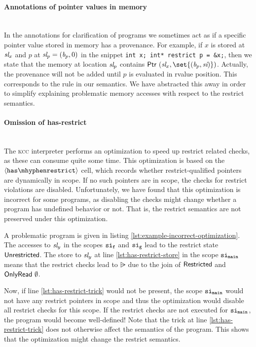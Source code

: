\paragraph{Annotations of pointer values in memory} \leavevmode \\
In the annotations for clarification of programs we sometimes act as if a specific pointer value stored in memory has a provenance.
For example, if $x$ is stored at $\textit{sl}_x$ and $p$ at $\textit{sl}_p = (\textit{b}_p, 0)$ in the snippet \texttt{int x; int* restrict p = &x;},
then we state that the memory at location $\textit{sl}_p$ contains $\ptr{(\Simplelocvar_x, \set{(\Blockvar_p, \Scopeidvar)})}$.
Actually, the provenance will not be added until $p$ is evaluated in rvalue position.
This corresponds to the rule  in our semantics.
We have abstracted this away in order to simplify explaining problematic memory accesses with respect to the restrict semantics.  


\paragraph{Omission of has-restrict} \leavevmode \\
The \textsc{kcc} interpreter performs an optimization to speed up restrict related checks, as these can consume quite some time.
This optimization is based on the $\mathtt{\langle has\mhyphen restrict \rangle}$ cell, which records whether restrict-qualified pointers
are dynamically in scope.
If no such pointers are in scope, the checks for restrict violations are disabled.
Unfortunately, we have found that this optimization is incorrect for some programs, as disabling
the checks might change whether a program has undefined behavior or not.
That is, the restrict semantics are not preserved under this optimization.

A problematic program is given in listing \ref{lst:example-incorrect-optimization}.
The accesses to $\textit{sl}_y$ in the scopes $\mathtt{si}_\mathtt{f}$ and $\mathtt{si}_\mathtt{g}$ lead to the restrict state $\mathsf{Unrestricted}$.
The store to $\textit{sl}_y$ at line \ref{lst:has-restrict-store} in the scope $\mathtt{si}_\mathtt{main}$
means that the restrict checks lead to $\rsub$ due to the join of $\mathsf{Restricted}$ and $\mathsf{OnlyRead} \ \emptyset$.

Now, if line \ref{lst:has-restrict-trick} would not be present, the scope $\mathtt{si}_\mathtt{main}$ would not have
any restrict pointers in scope and thus the optimization would disable all restrict checks for this scope.
If the restrict checks are not executed for $\mathtt{si}_\mathtt{main}$, the program would become well-defined!
Note that the trick at line \ref{lst:has-restrict-trick} does not otherwise affect the semantics of the program.
This shows that the optimization might change the restrict semantics.

